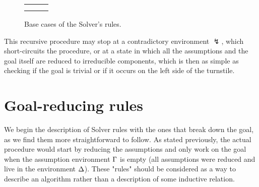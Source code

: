 \documentclass[english, mgr]{iithesis}
\newcommand{\solverRule}{\vdash}
\begin{document}
\begin{figure}[htpb]
\begin{tabularx}{\textwidth}{|CcC|}
&
\\ & & \\
\hline
    \end{tabularx}
  \caption{Base cases of the Solver's rules.}
  \label{fig:solver-base}
\end{figure}
This recursive procedure may stop at a contradictory environment $\lightning$,
which short-circuits the procedure, or at
a state in which all the assumptions and the goal itself are reduced to irreducible components,
which is then as simple as checking if the goal is trivial or if it
occurs on the left side of the turnstile.

\section{Goal-reducing rules}
We begin the description of Solver rules with the ones that break down the goal,
as we find them more straightforward to follow.
As stated previously, the actual procedure would start by reducing the assumptions
and only work on the goal when the assumption environment $\Gamma$ is empty
(all assumptions were reduced and live in the environment $\Delta$).
These "rules" should be considered as a way to describe an algorithm
rather than a description of some inductive relation.
\end{document}
